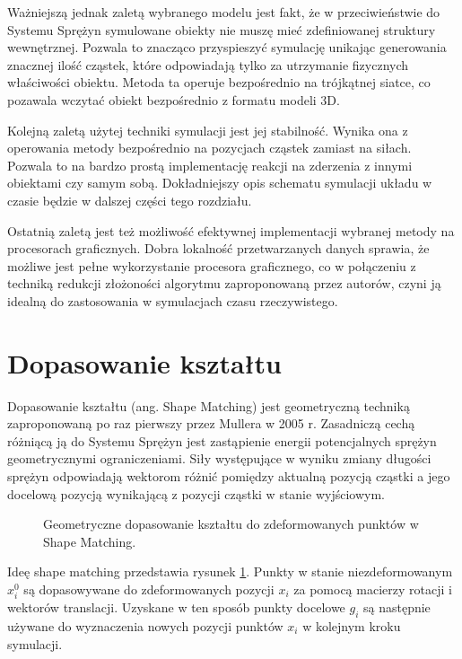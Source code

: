 Ważniejszą jednak zaletą wybranego modelu jest fakt, że w przeciwieństwie do
Systemu Sprężyn symulowane obiekty nie muszę mieć
zdefiniowanej struktury wewnętrznej. Pozwala to znacząco przyspieszyć symulację
unikając generowania znacznej ilość cząstek, które odpowiadają tylko za
utrzymanie fizycznych właściwości obiektu. Metoda ta operuje bezpośrednio na
trójkątnej siatce, co pozawala wczytać obiekt bezpośrednio z formatu modeli
3D.

Kolejną zaletą użytej techniki symulacji jest jej stabilność. Wynika ona z
operowania metody bezpośrednio na pozycjach cząstek zamiast na siłach. Pozwala
to na bardzo prostą implementację reakcji na zderzenia z innymi obiektami czy
samym sobą. Dokładniejszy opis schematu symulacji układu w czasie będzie w
dalszej części tego rozdziału.

Ostatnią zaletą jest też możliwość efektywnej implementacji wybranej metody na
procesorach graficznych. Dobra lokalność przetwarzanych danych sprawia, że
możliwe jest pełne wykorzystanie procesora graficznego, co w połączeniu z
techniką redukcji złożoności algorytmu zaproponowaną przez autorów, czyni ją
idealną do zastosowania w symulacjach czasu rzeczywistego.

\section{Dopasowanie kształtu}
Dopasowanie kształtu (ang. Shape Matching) jest geometryczną techniką
zaproponowaną po raz pierwszy przez Mullera \cite{shape} w 2005 r. Zasadniczą
cechą różniącą ją do Systemu Sprężyn jest zastąpienie energii
potencjalnych sprężyn geometrycznymi ograniczeniami. Siły występujące w wyniku
zmiany długości sprężyn odpowiadają wektorom różnić pomiędzy aktualną pozycją cząstki
a jego docelową pozycją wynikającą z pozycji cząstki w stanie wyjściowym.

\begin{figure}[ht]
\centering

\caption{Geometryczne dopasowanie kształtu do zdeformowanych punktów w Shape Matching.}
\label{shape-matching}
\end{figure}

Ideę shape matching przedstawia rysunek \ref{shape-matching}. Punkty w stanie
niezdeformowanym $x^0_i$ są dopasowywane do zdeformowanych pozycji $x_i$ za
pomocą macierzy rotacji i wektorów translacji. Uzyskane w ten sposób punkty docelowe
$g_i$ są następnie używane do wyznaczenia nowych pozycji punktów $x_i$ w
kolejnym kroku symulacji. 

